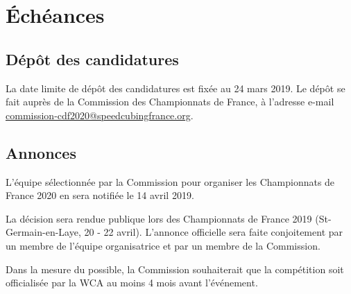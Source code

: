 \documentclass[a4paper,12pt]{scrartcl}
\begin{document}
\section*{Échéances}
\subsection*{Dépôt des candidatures}

La date limite de dépôt des candidatures est fixée au 24 mars 2019. Le dépôt se fait auprès de la Commission des Championnats de France, à l'adresse e-mail \href{mailto:commission-cdf2020@speedcubingfrance.org}{commission-cdf2020@speedcubingfrance.org}.

\subsection*{Annonces}

L'équipe sélectionnée par la Commission pour organiser les Championnats de France 2020 en sera notifiée le 14 avril 2019.

La décision sera rendue publique lors des Championnats de France 2019 (St-Germain-en-Laye, 20 - 22 avril). L'annonce officielle sera faite conjoitement par un membre de l'équipe organisatrice et par un membre de la Commission.

Dans la mesure du possible, la Commission souhaiterait que la compétition soit officialisée par la WCA au moins 4 mois avant l'événement.

\end{document}
